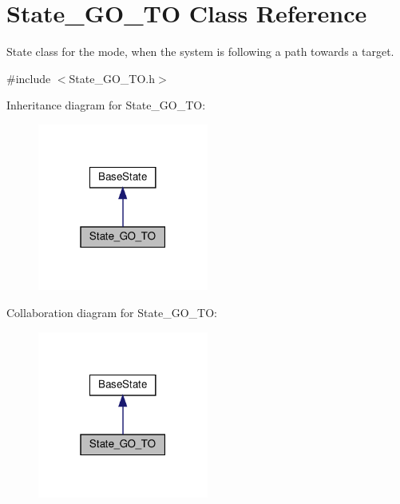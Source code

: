 \hypertarget{class_state___g_o___t_o}{}\section{State\+\_\+\+G\+O\+\_\+\+TO Class Reference}
\label{class_state___g_o___t_o}


State class for the mode, when the system is following a path towards a target.  




{\ttfamily \#include $<$State\+\_\+\+G\+O\+\_\+\+T\+O.\+h$>$}



Inheritance diagram for State\+\_\+\+G\+O\+\_\+\+TO\+:\nopagebreak
\begin{figure}[H]
\begin{center}
\leavevmode
\includegraphics[width=159pt]{class_state___g_o___t_o__inherit__graph}
\end{center}
\end{figure}


Collaboration diagram for State\+\_\+\+G\+O\+\_\+\+TO\+:\nopagebreak
\begin{figure}[H]
\begin{center}
\leavevmode
\includegraphics[width=159pt]{class_state___g_o___t_o__coll__graph}
\end{center}
\end{figure}
